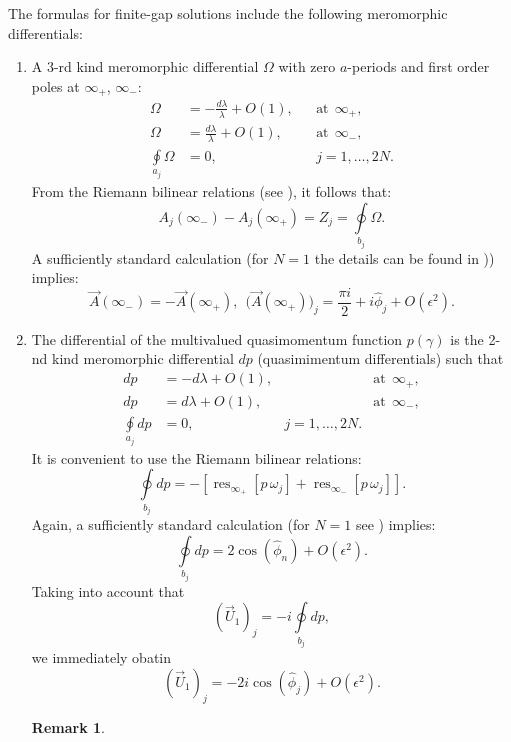 \documentclass[12pt]{article}
\newcommand{\res}{\mathop{\mathrm{res}}}
\newtheorem{remark}{Remark}
\begin{document}
The formulas for finite-gap solutions include the following meromorphic differentials:
\begin{enumerate}
\item A 3-rd kind meromorphic differential $\Omega$ with zero $a$-periods and first order poles at $\infty_+$,  
$\infty_-$:
\begin{align*}
\Omega &= -\frac{d\lambda}{\lambda}+O(1),& &\mbox{at} \ \ \infty_+ ,\\
\Omega &= \frac{d\lambda}{\lambda}+O(1),& &\mbox{at} \ \ \infty_- ,\\ 
\oint\limits_{a_j}\Omega&=0,& & j=1,\ldots,2N.
\end{align*}    
From the Riemann bilinear relations (see \cite{Spr1957}), it follows that:
$$
A_j(\infty_-)-A_j(\infty_+)=Z_j=\oint\limits_{b_j}\Omega.
$$
A sufficiently standard calculation (for $N=1$ the details can be found in \cite{GS1})) implies:
\begin{equation}
\label{eq:omega_per1}
\vec A(\infty_-) = - \vec A(\infty_+), \ \ 
\big(\vec A(\infty_+)\big)_j = \frac{\pi i}{2} +  i \hat\phi_j  + O(\epsilon^2).
\end{equation}
\item The differential of the multivalued quasimomentum function $p(\gamma)$ is the 2-nd kind meromorphic differential $dp$ (quasimimentum differentials) such that
\begin{align*}
dp &= -d\lambda +O(1),& &\mbox{at} \ \ \infty_+ , \\
dp &=  d\lambda +O(1),& &\mbox{at} \ \ \infty_- ,\\ 
\oint\limits_{a_j}dp &=0,&  j=1,\ldots,2N.
\end{align*} 
It is convenient to use the Riemann bilinear relations:
$$
\oint\limits_{b_j}dp=- \left[\res\nolimits_{\infty_+} [p\,\omega_j]+ \res\nolimits_{\infty_-} [p\, \omega_j]  \right].
$$
Again, a sufficiently standard calculation (for $N=1$ see \cite{GS1}) implies:
\begin{equation}
\label{eq:dp_per1}
\oint\limits_{b_j}dp=2\cos(\hat\phi_n) +O(\epsilon^2).
\end{equation}
Taking into account that 
\begin{equation}
\label{eq:U1}
\left(\vec U_1 \right)_j = - i\oint\limits_{b_j}dp,
\end{equation}
we immediately obatin
\begin{equation}
\label{eq:U1bis}
\left(\vec U_1 \right)_j=-2i\cos(\hat\phi_j) +O(\epsilon^2).
\end{equation}
\begin{remark}

\end{remark}
\end{enumerate}
\end{document}
